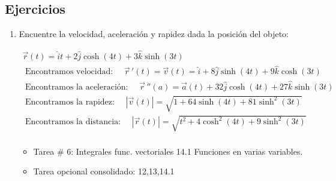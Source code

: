\subsection{Ejercicios}
\begin{enumerate}
    \item Encuentre la velocidad, aceleración y rapidez dada la posición del objeto:
        \begin{center}
            \begin{align*}
                \vec{r}(t) = \hat{i} t  + 2 \hat{j} \cosh(4t) + 3 \hat{k} \sinh(3t) \\ 
                \text{  Encontramos velocidad:  } \quad \vec{r}\, ' (t) = \vec{v}(t) = \hat{i} + 8 \hat{j} \sinh(4t)+9 \hat{k} \cosh(3t) \\ 
                \text{  Encontramos la aceleración:  } \quad \vec{r}\, ''(a) = \vec{a}(t) + 32 \hat{j} \cosh(4t) + 27 \hat{k} \sinh(3t) \\ 
                \text{  Encontramos la rapidez:   } \quad \left| \vec{v}(t) \right| = \sqrt{1+64\sinh(4t)+81\sinh^2(3t)} \\ 
                \text{  Encontramos la distancia:   } \quad \left| \vec{r}(t) \right| = \sqrt{t^2+4\cosh^2(4t)+9\sinh^2(3t)} \\ 
            \end{align*}
            \begin{itemize}[label=\#]
                \item Tarea \# 6: Integrales func. vectoriales 14.1 Funciones en varias variables.
                \item Tarea opcional consolidado: 12,13,14.1 
            \end{itemize}
        \end{center}
    

\end{enumerate}
